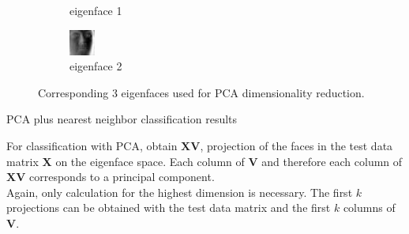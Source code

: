 \documentclass[a4paper]{exam}
\begin{document}
\begin{questions}
\begin{figure}[ht]
\begin{subfigure}[b]{0.3\textwidth}
            \caption{eigenface 1}
            \label{fig:eigenface1}
        \end{subfigure}
        \hfill
        \begin{subfigure}[b]{0.3\textwidth}
            \centering
            \includegraphics[width=\textwidth]{eigenface2}
            \caption{eigenface 2}
            \label{fig:eigenface2}
        \end{subfigure}
        \caption{Corresponding 3 eigenfaces used for PCA dimensionality reduction.}
        \label{fig:eigenface}
    \end{figure}

    \clearpage\question PCA plus nearest neighbor classification results

    For classification with PCA, obtain $\mathbf{XV}$, projection of the faces in the test data matrix $\mathbf{X}$ on the
    eigenface space. Each column of $\mathbf{V}$ and therefore each column of $\mathbf{XV}$ corresponds to a principal component.\\
    Again, only calculation for the highest dimension is necessary. The first $k$ projections can be obtained
    with the test data matrix and the first $k$ columns of $\mathbf{V}$.


\end{questions}
\end{document}
